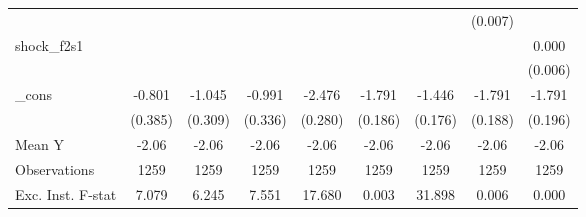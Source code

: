 {\begin{tabular}{l*{8}{c}}
            &                     &                     &                     &                     &                     &                     &     (0.007)         &                     \\
\addlinespace
shock\_f2s1  &                     &                     &                     &                     &                     &                     &                     &       0.000         \\
            &                     &                     &                     &                     &                     &                     &                     &     (0.006)         \\
\addlinespace
\_cons      &      -0.801\sym{**} &      -1.045\sym{***}&      -0.991\sym{***}&      -2.476\sym{***}&      -1.791\sym{***}&      -1.446\sym{***}&      -1.791\sym{***}&      -1.791\sym{***}\\
            &     (0.385)         &     (0.309)         &     (0.336)         &     (0.280)         &     (0.186)         &     (0.176)         &     (0.188)         &     (0.196)         \\
\midrule
Mean Y      &       -2.06         &       -2.06         &       -2.06         &       -2.06         &       -2.06         &       -2.06         &       -2.06         &       -2.06         \\
Observations&        1259         &        1259         &        1259         &        1259         &        1259         &        1259         &        1259         &        1259         \\
Exc. Inst. F-stat&       7.079         &       6.245         &       7.551         &      17.680         &       0.003         &      31.898         &       0.006         &       0.000         \\
\bottomrule
\end{tabular}
}
